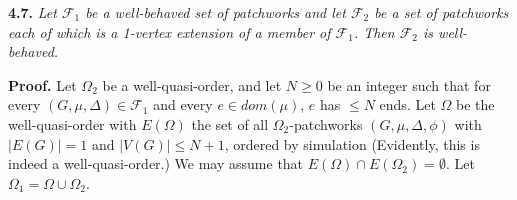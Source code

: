 \textbf{4.7.} \textit{Let $\mathcal{F}_1$ be a well-behaved set of patchworks and let $\mathcal{F}_2$ be a set of patchworks each of which is a 1-vertex extension of a member of $\mathcal{F}_1$. Then $\mathcal{F}_2$ is well-behaved.}

\textbf{Proof.} Let $\Omega_2$ be a well-quasi-order, and let $N \ge 0$ be an integer such that for every $(G, \mu, \Delta) \in \mathcal{F}_1$ and every $e \in dom(\mu)$, $e$ has $\le N$ ends. Let $\Omega$ be the well-quasi-order with $E(\Omega)$ the set of all $\Omega_2$-patchworks $(G, \mu, \Delta, \phi)$ with $|E(G)| = 1$ and $|V(G)| \le N + 1$, ordered by simulation (Evidently, this is indeed a well-quasi-order.) We may assume that $E(\Omega) \cap E(\Omega_2) = \emptyset$. Let $\Omega_1 = \Omega \cup \Omega_2$.
